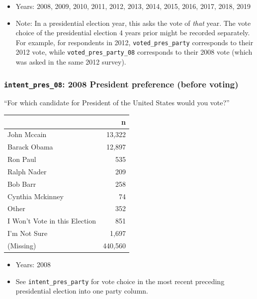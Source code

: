\documentclass[10pt,article,oneside]{memoir}
\theoremstyle{definition}
\begin{document}
\begin{itemize}
\tightlist
\item
  Years: 2008, 2009, 2010, 2011, 2012, 2013, 2014, 2015, 2016, 2017,
  2018, 2019
\item
  Note: In a presidential election year, this asks the vote of
  \emph{that} year. The vote choice of the presidential election 4 years
  prior might be recorded separately. For example, for respondents in
  2012, \texttt{voted\_pres\_party} corresponds to their 2012 vote,
  while \texttt{voted\_pres\_party\_08} corresponds to their 2008 vote
  (which was asked in the same 2012 survey).
\end{itemize}

\hypertarget{intent_pres_08-2008-president-preference-before-voting}{%
\subsubsection{\texorpdfstring{\texttt{intent\_pres\_08}: 2008 President
preference (before
voting)}{intent\_pres\_08: 2008 President preference (before voting)}}\label{intent_pres_08-2008-president-preference-before-voting}}

``For which candidate for President of the United States would you
vote?''

\begin{table}[H]
\centering
\begin{tabular}{lr}
\toprule
 & n\\
\midrule
John Mccain & 13,322\\
Barack Obama & 12,897\\
Ron Paul & 535\\
Ralph Nader & 209\\
Bob Barr & 258\\
Cynthia Mckinney & 74\\
Other & 352\\
I Won't Vote in this Election & 851\\
I'm Not Sure & 1,697\\
(Missing) & 440,560\\
\bottomrule
\end{tabular}
\end{table}

\begin{itemize}
\tightlist
\item
  Years: 2008
\item
  See \texttt{intent\_pres\_party} for vote choice in the most recent
  preceding presidential election into one party column.
\end{itemize}
\end{document}
